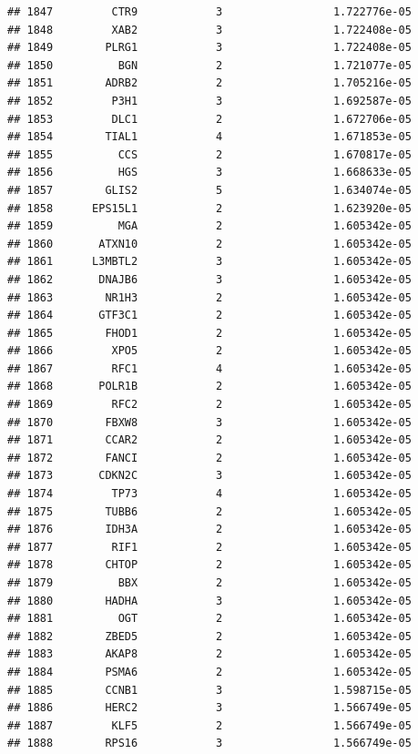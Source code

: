 \documentclass[
]{article}
\begin{document}
\begin{verbatim}
## 1847         CTR9            3                 1.722776e-05
## 1848         XAB2            3                 1.722408e-05
## 1849        PLRG1            3                 1.722408e-05
## 1850          BGN            2                 1.721077e-05
## 1851        ADRB2            2                 1.705216e-05
## 1852         P3H1            3                 1.692587e-05
## 1853         DLC1            2                 1.672706e-05
## 1854        TIAL1            4                 1.671853e-05
## 1855          CCS            2                 1.670817e-05
## 1856          HGS            3                 1.668633e-05
## 1857        GLIS2            5                 1.634074e-05
## 1858      EPS15L1            2                 1.623920e-05
## 1859          MGA            2                 1.605342e-05
## 1860       ATXN10            2                 1.605342e-05
## 1861      L3MBTL2            3                 1.605342e-05
## 1862       DNAJB6            3                 1.605342e-05
## 1863        NR1H3            2                 1.605342e-05
## 1864       GTF3C1            2                 1.605342e-05
## 1865        FHOD1            2                 1.605342e-05
## 1866         XPO5            2                 1.605342e-05
## 1867         RFC1            4                 1.605342e-05
## 1868       POLR1B            2                 1.605342e-05
## 1869         RFC2            2                 1.605342e-05
## 1870        FBXW8            3                 1.605342e-05
## 1871        CCAR2            2                 1.605342e-05
## 1872        FANCI            2                 1.605342e-05
## 1873       CDKN2C            3                 1.605342e-05
## 1874         TP73            4                 1.605342e-05
## 1875        TUBB6            2                 1.605342e-05
## 1876        IDH3A            2                 1.605342e-05
## 1877         RIF1            2                 1.605342e-05
## 1878        CHTOP            2                 1.605342e-05
## 1879          BBX            2                 1.605342e-05
## 1880        HADHA            3                 1.605342e-05
## 1881          OGT            2                 1.605342e-05
## 1882        ZBED5            2                 1.605342e-05
## 1883        AKAP8            2                 1.605342e-05
## 1884        PSMA6            2                 1.605342e-05
## 1885        CCNB1            3                 1.598715e-05
## 1886        HERC2            3                 1.566749e-05
## 1887         KLF5            2                 1.566749e-05
## 1888        RPS16            3                 1.566749e-05

\end{verbatim}
\end{document}
